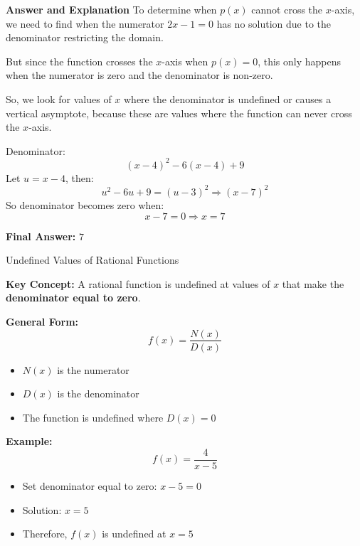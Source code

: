 \documentclass{beamer}
\begin{document}
\begin{frame}{\textbf{Answer and Explanation}}
To determine when \( p(x) \) cannot cross the \( x \)-axis, we need to find when the numerator \( 2x - 1 = 0 \) has no solution due to the denominator restricting the domain.

But since the function crosses the \( x \)-axis when \( p(x) = 0 \), this only happens when the numerator is zero and the denominator is non-zero.

So, we look for values of \( x \) where the denominator is undefined or causes a vertical asymptote, because these are values where the function can never cross the \( x \)-axis.

Denominator:
\[
(x - 4)^2 - 6(x - 4) + 9
\]
Let \( u = x - 4 \), then:
\[
u^2 - 6u + 9 = (u - 3)^2
\Rightarrow (x - 7)^2
\]
So denominator becomes zero when:
\[
x - 7 = 0 \Rightarrow x = 7
\]

\textbf{Final Answer:} \( \boxed{7} \)
\end{frame}






\begin{frame}{Undefined Values of Rational Functions}
\small

\textbf{Key Concept:}  
A rational function is undefined at values of $x$ that make the \textbf{denominator equal to zero}.

\vspace{0.3cm}
\textbf{General Form:}
\[
f(x) = \frac{N(x)}{D(x)}
\]
\begin{itemize}
    \item $N(x)$ is the numerator
    \item $D(x)$ is the denominator
    \item The function is undefined where $D(x) = 0$
\end{itemize}

\vspace{0.2cm}
\textbf{Example:}
\[
f(x) = \frac{4}{x - 5}
\]
\begin{itemize}
    \item Set denominator equal to zero: $x - 5 = 0$
    \item Solution: $x = 5$
    \item Therefore, $f(x)$ is undefined at $x = 5$
\end{itemize}

\end{frame}
\end{document}
